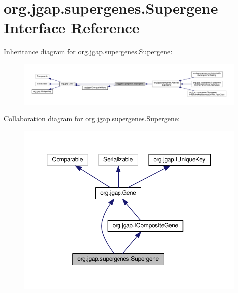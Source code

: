 \hypertarget{interfaceorg_1_1jgap_1_1supergenes_1_1_supergene}{\section{org.\-jgap.\-supergenes.\-Supergene Interface Reference}
\label{interfaceorg_1_1jgap_1_1supergenes_1_1_supergene}
}


Inheritance diagram for org.\-jgap.\-supergenes.\-Supergene\-:
\nopagebreak
\begin{figure}[H]
\begin{center}
\leavevmode
\includegraphics[width=350pt]{interfaceorg_1_1jgap_1_1supergenes_1_1_supergene__inherit__graph}
\end{center}
\end{figure}


Collaboration diagram for org.\-jgap.\-supergenes.\-Supergene\-:
\nopagebreak
\begin{figure}[H]
\begin{center}
\leavevmode
\includegraphics[width=350pt]{interfaceorg_1_1jgap_1_1supergenes_1_1_supergene__coll__graph}
\end{center}
\end{figure}
